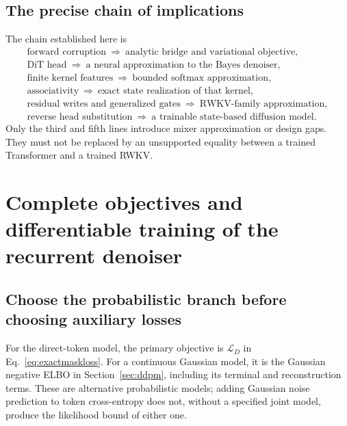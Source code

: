 \documentclass{article}
\theoremstyle{remark}\newtheorem{remark}[theorem]{Remark}
\begin{document}
\subsection{The precise chain of implications}
The chain established here is
\begin{equation}
 \begin{gathered}
 \text{forward corruption}\ \Rightarrow\ \text{analytic bridge and variational objective},\\
 \text{DiT head}\ \Rightarrow\ \text{a neural approximation to the Bayes denoiser},\\
 \text{finite kernel features}\ \Rightarrow\ \text{bounded softmax approximation},\\
 \text{associativity}\ \Rightarrow\ \text{exact state realization of that kernel},\\
 \text{residual writes and generalized gates}\ \Rightarrow\ \text{RWKV-family approximation},\\
 \text{reverse head substitution}\ \Rightarrow\ \text{a trainable state-based diffusion model}.
 \end{gathered}
\end{equation}
Only the third and fifth lines introduce mixer approximation or design gaps. They must not be replaced by an unsupported equality between a trained Transformer and a trained RWKV.

\section{Complete objectives and differentiable training of the recurrent denoiser}
\label{sec:training}
\subsection{Choose the probabilistic branch before choosing auxiliary losses}
For the direct-token model, the primary objective is $\mathcal L_D$ in Eq.~\eqref{eq:exactmaskloss}. For a continuous Gaussian model, it is the Gaussian negative ELBO in Section~\ref{sec:ddpm}, including its terminal and reconstruction terms. These are alternative probabilistic models; adding Gaussian noise prediction to token cross-entropy does not, without a specified joint model, produce the likelihood bound of either one.
\end{document}
